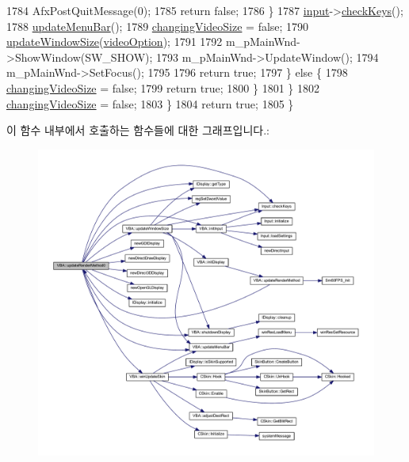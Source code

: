 \begin{DoxyCode}
1784           AfxPostQuitMessage(0);
1785           \textcolor{keywordflow}{return} \textcolor{keyword}{false};
1786         \}
1787         \mbox{\hyperlink{class_v_b_a_aaab971cb5d67a69e1a26502d15a4dc60}{input}}->\mbox{\hyperlink{class_input_a91418a5762e6e50aa4f59e4ce92d2dfa}{checkKeys}}();
1788         \mbox{\hyperlink{class_v_b_a_accf3451bad473b90400193636cd27c96}{updateMenuBar}}();
1789         \mbox{\hyperlink{class_v_b_a_ace8fe4b9a73291e292f0d4879cf2c852}{changingVideoSize}} = \textcolor{keyword}{false};
1790         \mbox{\hyperlink{class_v_b_a_ac278ece4958310ce2ef8751afbad08f3}{updateWindowSize}}(\mbox{\hyperlink{class_v_b_a_a17dac073149c897f770c00ed7098ad32}{videoOption}});
1791 
1792         m\_pMainWnd->ShowWindow(SW\_SHOW);
1793         m\_pMainWnd->UpdateWindow();
1794         m\_pMainWnd->SetFocus();
1795         
1796         \textcolor{keywordflow}{return} \textcolor{keyword}{true};
1797       \} \textcolor{keywordflow}{else} \{
1798         \mbox{\hyperlink{class_v_b_a_ace8fe4b9a73291e292f0d4879cf2c852}{changingVideoSize}} = \textcolor{keyword}{false};
1799         \textcolor{keywordflow}{return} \textcolor{keyword}{true};
1800       \}
1801     \}
1802     \mbox{\hyperlink{class_v_b_a_ace8fe4b9a73291e292f0d4879cf2c852}{changingVideoSize}} = \textcolor{keyword}{false};
1803   \}
1804   \textcolor{keywordflow}{return} \textcolor{keyword}{true};
1805 \}
\end{DoxyCode}
이 함수 내부에서 호출하는 함수들에 대한 그래프입니다.\+:
\nopagebreak
\begin{figure}[H]
\begin{center}
\leavevmode
\includegraphics[width=350pt]{class_v_b_a_a0db47ba257f450e098e7079199385b70_cgraph}
\end{center}
\end{figure}
